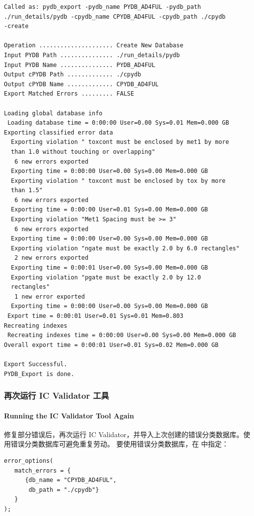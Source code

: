 \begin{lstlisting}[style=shell,caption={初始错误分类数据库},label={ex:init-cpydb}]
Called as: pydb_export -pydb_name PYDB_AD4FUL -pydb_path
./run_details/pydb -cpydb_name CPYDB_AD4FUL -cpydb_path ./cpydb
-create

Operation ..................... Create New Database
Input PYDB Path ............... ./run_details/pydb
Input PYDB Name ............... PYDB_AD4FUL
Output cPYDB Path ............. ./cpydb
Output cPYDB Name ............. CPYDB_AD4FUL
Export Matched Errors ......... FALSE

Loading global database info
 Loading database time = 0:00:00 User=0.00 Sys=0.01 Mem=0.000 GB
Exporting classified error data
  Exporting violation " toxcont must be enclosed by met1 by more
  than 1.0 without touching or overlapping"
   6 new errors exported
  Exporting time = 0:00:00 User=0.00 Sys=0.00 Mem=0.000 GB
  Exporting violation " toxcont must be enclosed by tox by more
  than 1.5"
   6 new errors exported
  Exporting time = 0:00:00 User=0.01 Sys=0.00 Mem=0.000 GB
  Exporting violation "Met1 Spacing must be >= 3"
   6 new errors exported
  Exporting time = 0:00:00 User=0.00 Sys=0.00 Mem=0.000 GB
  Exporting violation "ngate must be exactly 2.0 by 6.0 rectangles"
   2 new errors exported
  Exporting time = 0:00:01 User=0.00 Sys=0.00 Mem=0.000 GB
  Exporting violation "pgate must be exactly 2.0 by 12.0
  rectangles"
   1 new error exported
  Exporting time = 0:00:00 User=0.00 Sys=0.00 Mem=0.000 GB
 Export time = 0:00:01 User=0.01 Sys=0.01 Mem=0.803
Recreating indexes
 Recreating indexes time = 0:00:00 User=0.00 Sys=0.00 Mem=0.000 GB
Overall export time = 0:00:01 User=0.01 Sys=0.02 Mem=0.000 GB

Export Successful.
PYDB_Export is done.
\end{lstlisting}

\subsubsection{再次运行 IC Validator 工具}
\paragraph*{Running the IC Validator Tool Again}

修复部分错误后，再次运行 IC Validator，并导入上次创建的错误分类数据库。使用错误分类数据库可避免重复劳动。
要使用错误分类数据库，在  中指定：
\begin{lstlisting}[style=pxl]
error_options(
   match_errors = {
      {db_name = "CPYDB_AD4FUL",
       db_path = "./cpydb"}
   }
);
\end{lstlisting}

